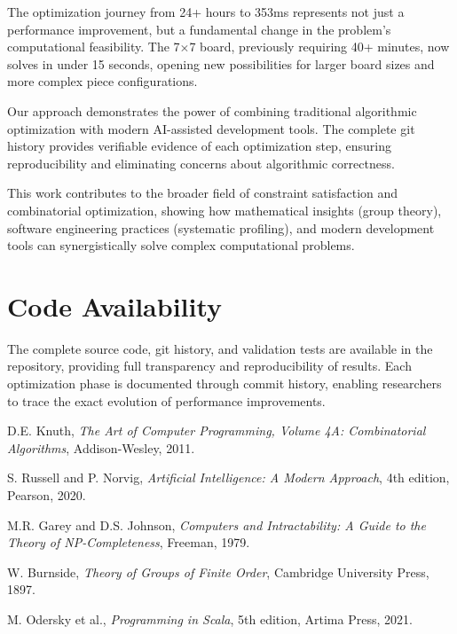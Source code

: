 \documentclass[12pt,a4paper]{article}
\theoremstyle{definition}
\begin{document}
The optimization journey from 24+ hours to 353ms represents not just a performance improvement, but a fundamental change in the problem's computational feasibility. The 7$\times$7 board, previously requiring 40+ minutes, now solves in under 15 seconds, opening new possibilities for larger board sizes and more complex piece configurations.

Our approach demonstrates the power of combining traditional algorithmic optimization with modern AI-assisted development tools. The complete git history provides verifiable evidence of each optimization step, ensuring reproducibility and eliminating concerns about algorithmic correctness.

This work contributes to the broader field of constraint satisfaction and combinatorial optimization, showing how mathematical insights (group theory), software engineering practices (systematic profiling), and modern development tools can synergistically solve complex computational problems.

\section{Code Availability}

The complete source code, git history, and validation tests are available in the repository, providing full transparency and reproducibility of results. Each optimization phase is documented through commit history, enabling researchers to trace the exact evolution of performance improvements.


\begin{thebibliography}{99}

D.E. Knuth, \emph{The Art of Computer Programming, Volume 4A: Combinatorial Algorithms}, Addison-Wesley, 2011.

S. Russell and P. Norvig, \emph{Artificial Intelligence: A Modern Approach}, 4th edition, Pearson, 2020.

M.R. Garey and D.S. Johnson, \emph{Computers and Intractability: A Guide to the Theory of NP-Completeness}, Freeman, 1979.

W. Burnside, \emph{Theory of Groups of Finite Order}, Cambridge University Press, 1897.

M. Odersky et al., \emph{Programming in Scala}, 5th edition, Artima Press, 2021.

\end{thebibliography}
\end{document}

